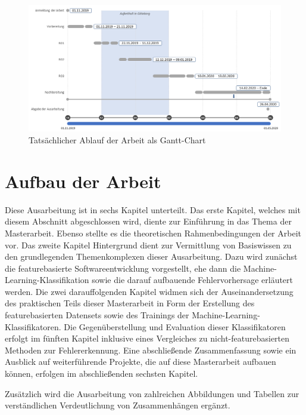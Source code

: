 \begin{figure}[H]
    \centering
    \includegraphics[width=\textwidth]{images/Zeit}
    \caption{Tatsächlicher Ablauf der Arbeit als Gantt-Chart}\label{fig:zeit}
\end{figure}

\section{Aufbau der Arbeit}

Diese Ausarbeitung ist in sechs Kapitel unterteilt. Das erste Kapitel, welches mit diesem Abschnitt abgeschlossen wird, diente zur Einführung in das Thema der Masterarbeit. Ebenso stellte es die theoretischen Rahmenbedingungen der Arbeit vor. Das zweite Kapitel \glqq Hintergrund\grqq{} dient zur Vermittlung von Basiswissen zu den grundlegenden Themenkomplexen dieser Ausarbeitung. Dazu wird zunächst die featurebasierte Softwareentwicklung vorgestellt, ehe dann die Machine-Learning-Klassifikation sowie die darauf aufbauende Fehlervorhersage erläutert werden. Die zwei darauffolgenden Kapitel widmen sich der Auseinandersetzung des praktischen Teils dieser Masterarbeit in Form der Erstellung des featurebasierten Datensets sowie des Trainings der Machine-Learning-Klassifikatoren. Die Gegenüberstellung und Evaluation dieser Klassifikatoren erfolgt im fünften Kapitel inklusive eines Vergleiches zu nicht-featurebasierten Methoden zur Fehlererkennung. Eine abschließende Zusammenfassung sowie ein Ausblick auf weiterführende Projekte, die auf diese Masterarbeit aufbauen können, erfolgen im abschließenden sechsten Kapitel.

Zusätzlich wird die Ausarbeitung von zahlreichen Abbildungen und Tabellen zur verständlichen Verdeutlichung von Zusammenhängen ergänzt.

\cleardoublepage
